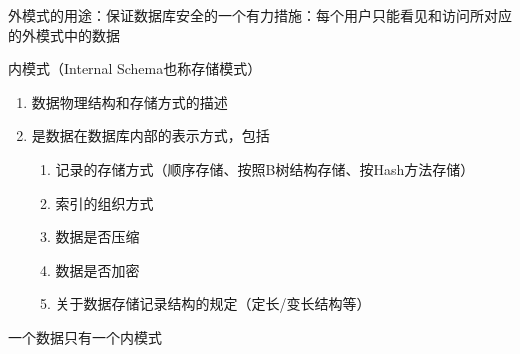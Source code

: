 \documentclass{article}
\begin{document}
外模式的用途：保证数据库安全的一个有力措施：每个用户只能看见和访问所对应的外模式中的数据

内模式（Internal Schema也称存储模式）

\begin{enumerate}
    \item 数据物理结构和存储方式的描述
    \item 是数据在数据库内部的表示方式，包括
    \begin{enumerate}
        \item 记录的存储方式（顺序存储、按照B树结构存储、按Hash方法存储）
        \item 索引的组织方式
        \item 数据是否压缩
        \item 数据是否加密
        \item 关于数据存储记录结构的规定（定长/变长结构等）
    \end{enumerate}
\end{enumerate}
一个数据只有一个内模式
\end{document}
